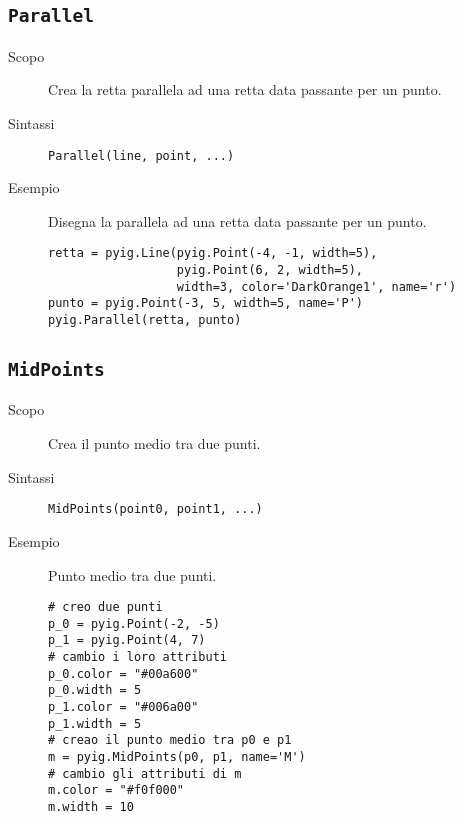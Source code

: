 \subsection{\lstinline{Parallel}}
\label{sub:geoint_parallel}

\begin{description} 
 \item [Scopo] Crea la retta parallela ad una retta data passante per un punto.
 \item [Sintassi] \lstinline{Parallel(line, point, ...)}
% 
% 

 \item [Esempio] Disegna la parallela ad una retta data passante per un punto.
\begin{lstlisting}
retta = pyig.Line(pyig.Point(-4, -1, width=5), 
                  pyig.Point(6, 2, width=5), 
                  width=3, color='DarkOrange1', name='r')
punto = pyig.Point(-3, 5, width=5, name='P')
pyig.Parallel(retta, punto)
\end{lstlisting}

\end{description}

\subsection{\lstinline{MidPoints}}
\label{sub:geoint_midpoints}

\begin{description}
 \item [Scopo] Crea il punto medio tra due punti.
 \item [Sintassi] \lstinline{MidPoints(point0, point1, ...)}
% 

 \item [Esempio]Punto medio tra due punti.

\begin{lstlisting}
# creo due punti
p_0 = pyig.Point(-2, -5)
p_1 = pyig.Point(4, 7)
# cambio i loro attributi
p_0.color = "#00a600"
p_0.width = 5
p_1.color = "#006a00"
p_1.width = 5
# creao il punto medio tra p0 e p1
m = pyig.MidPoints(p0, p1, name='M')
# cambio gli attributi di m
m.color = "#f0f000"
m.width = 10
\end{lstlisting}

\end{description}

